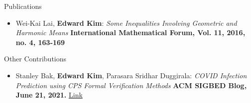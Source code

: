 \documentclass{resume} %
\begin{document}
\begin{rSection}{Publications}
\begin{itemize}[leftmargin=*]
    \item Wei-Kai Lai, {\bf Edward Kim}: \newline
    \textit{Some Inequalities Involving Geometric and Harmonic Means} \newline
    {\bf International Mathematical Forum, Vol. 11, 2016, no. 4, 163-169}
  \end{itemize}
\end{rSection}

\begin{rSection}{Other Contributions}
  \begin{itemize}[leftmargin=*]

    \item Stanley Bak, {\bf Edward Kim}, Parasara Sridhar Duggirala: \newline
    \textit{COVID Infection Prediction using CPS Formal Verification Methods} \newline
    {\bf ACM SIGBED Blog, June 21, 2021.} \href{https://sigbed.org/2021/06/21/sidbed-blog-covid-formal-verification/}{Link}
  \end{itemize}
\end{rSection}
\end{document}
